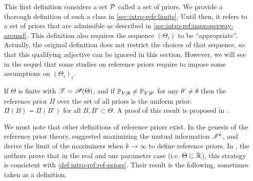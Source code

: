 This first definition considers a set $\mathcal{P}$ called a set of priors. 
We provide a thorough definition of such a class in \cref{sec:intro-refs:limits}.
Until then, it refers to a set of priors that are admissible as described in \cref{sec:intro-ref:improperway-around}.
This definition also
requires the sequence $(\Theta_i)$ to be ``appropriate''.
Actually,  the original definition does not restrict the choices of that sequence, so that this qualifying adjective can be ignored in this section.
However, we will see in the sequel that some studies on reference priors require to impose some assumptions on $(\Theta_i)_i$. 

{
\begin{ex}
    If $\Theta$ is finite with $\mathscr{T}=\mathscr{P}(\Theta)$, and if $\mathbb{P}_{Y|\theta}\ne\mathbb{P}_{Y|\theta'}$ for any $\theta'\ne\theta$ then the reference prior $\varPi$ over the set of all priors is the uniform prior: $\varPi(B)=\varPi(B')$ for all $B,B'\subset\Theta$. A proof of this result is proposed in \cite{mure_objective_2018}.
\end{ex}
}


We must note that other definitions of reference priors exist.
In the genesis of the reference prior theory, \citet{bernardo_reference_1979} suggested maximizing the mutual information $\mathscr{I}^k$, and derive the limit of the maximizers when $k\to\infty$ to define reference priors.
In \cite{berger_formal_2009}, the authors prove that in the real and one parameter case (i.e. $\Theta\subset\mathbb{R}$), this strategy is consistent with \cref{def:intro-ref:ref-priors}. Their result is the following, sometimes taken as a definition.

